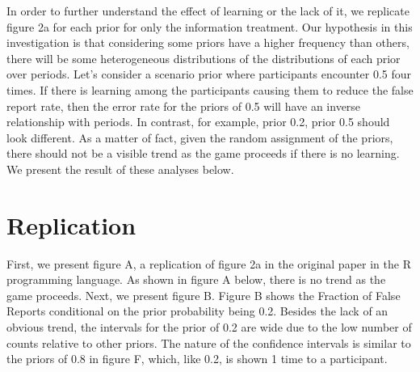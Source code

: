 \documentclass[12pt,a4paper]{article}
\begin{document}
	\hspace *{0mm} In order to further understand the effect of learning or the lack of it, we replicate figure 2a for each prior for only the information treatment. Our hypothesis in this investigation is that considering some priors have a higher frequency than others, there will be some heterogeneous distributions of the distributions of each prior over periods. Let's consider a scenario prior where participants encounter 0.5 four times. If there is learning among the participants causing them to reduce the false report rate, then the error rate for the priors of 0.5 will have an inverse relationship with periods. In contrast, for example, prior 0.2, prior 0.5 should look different. As a matter of fact, given the random assignment of the priors, there should not be a visible trend as the game proceeds if there is no learning. We present the result of these analyses below.
	
	\section{Replication}
	
	
	
	
	First, we present figure A, a replication of figure 2a in the original paper in the R programming language. As shown in figure A below, there is no trend as the game proceeds. Next, we present figure B. Figure B shows the Fraction of False Reports conditional on the prior probability being 0.2. Besides the lack of an obvious trend, the intervals for the prior of 0.2 are wide due to the low number of counts relative to other priors. The nature of the confidence intervals is similar to the priors of 0.8 in figure F, which, like 0.2, is shown 1 time to a participant.
	
\end{document}
